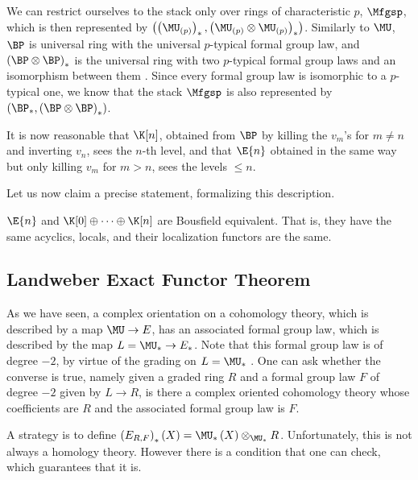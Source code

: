 We can restrict ourselves to the stack only over rings of characteristic $p$, $\Mfgsp$, which is then represented by $\left(\left(\MU_{\left(p\right)}\right)_*, \left(\MU_{\left(p\right)} \otimes \MU_{\left(p\right)}\right)_*\right)$. 
Similarly to $\MU$, $\BP$ is universal ring with the universal $p$-typical formal group law, and $\left(\BP \otimes \BP\right)_*$ is the universal ring with two $p$-typical formal group laws and an isomorphism between them .
Since every formal group law is isomorphic to a $p$-typical one, we know that the stack $\Mfgsp$ is also represented by $\left(\BP_*, \left(\BP \otimes \BP\right)_*\right)$.

It is now reasonable that $\K[n]$, obtained from $\BP$ by killing the $v_m$'s for $m \neq n$ and inverting $v_n$, sees the $n$-th level, and that $\E{n}$ obtained in the same way but only killing $v_m$ for $m > n$, sees the levels $\leq n$.

Let us now claim a precise statement, formalizing this description.

\begin{theorem}
	$\E{n}$ and $\K[0] \oplus \cdots \oplus \K[n]$ are Bousfield equivalent.
	That is, they have the same acyclics, locals, and their localization functors are the same.
\end{theorem}




\subsection{Landweber Exact Functor Theorem}

As we have seen, a complex orientation on a cohomology theory, which is described by a map $\MU \to E$, has an associated formal group law, which is described by the map $L = \MU_* \to E_*$.
Note that this formal group law is of degree $-2$, by virtue of the grading on $L = \MU_*$ .
One can ask whether the converse is true, namely given a graded ring $R$ and a formal group law $F$ of degree $-2$ given by $L \to R$, is there a complex oriented cohomology theory whose coefficients are $R$ and the associated formal group law is $F$.

A strategy is to define $\left(E_{R,F}\right)_*\left(X\right) = \MU_*\left(X\right) \otimes_{\MU_*} R$.
Unfortunately, this is not always a homology theory.
However there is a condition that one can check, which guarantees that it is.

